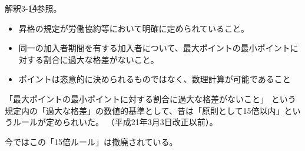 \begin{itembox}[l]{}
  解釈3-1\textcircled{4}参照。
\end{itembox}

\begin{sol}

  \;

  \begin{itemize}
    \item 昇格の規定が労働協約等において明確に定められていること。
    \item 同一の加入者期間を有する加入者について、最大ポイントの最小ポイントに対する割合に過大な格差がないこと。
    \item ポイントは恣意的に決められるものではなく、数理計算が可能であること
  \end{itemize}
  
\end{sol}

\begin{shadebox}
  「最大ポイントの最小ポイントに対する割合に過大な格差がないこと」
  という規定内の「過大な格差」の数値的基準として、昔は「原則として15倍以内」というルールが定められいた。
  （平成21年3月3日改正以前）。

  今ではこの「15倍ルール」は撤廃されている。
\end{shadebox}

\newpage
